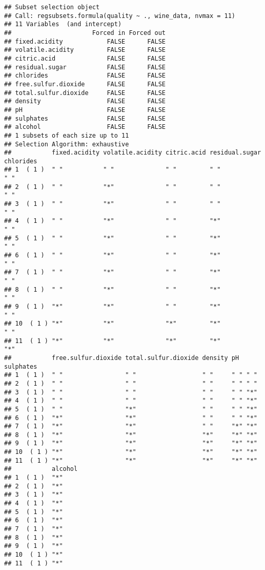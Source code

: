 \documentclass[
]{article}
\begin{document}
\begin{verbatim}
## Subset selection object
## Call: regsubsets.formula(quality ~ ., wine_data, nvmax = 11)
## 11 Variables  (and intercept)
##                      Forced in Forced out
## fixed.acidity            FALSE      FALSE
## volatile.acidity         FALSE      FALSE
## citric.acid              FALSE      FALSE
## residual.sugar           FALSE      FALSE
## chlorides                FALSE      FALSE
## free.sulfur.dioxide      FALSE      FALSE
## total.sulfur.dioxide     FALSE      FALSE
## density                  FALSE      FALSE
## pH                       FALSE      FALSE
## sulphates                FALSE      FALSE
## alcohol                  FALSE      FALSE
## 1 subsets of each size up to 11
## Selection Algorithm: exhaustive
##           fixed.acidity volatile.acidity citric.acid residual.sugar chlorides
## 1  ( 1 )  " "           " "              " "         " "            " "      
## 2  ( 1 )  " "           "*"              " "         " "            " "      
## 3  ( 1 )  " "           "*"              " "         " "            " "      
## 4  ( 1 )  " "           "*"              " "         "*"            " "      
## 5  ( 1 )  " "           "*"              " "         "*"            " "      
## 6  ( 1 )  " "           "*"              " "         "*"            " "      
## 7  ( 1 )  " "           "*"              " "         "*"            " "      
## 8  ( 1 )  " "           "*"              " "         "*"            " "      
## 9  ( 1 )  "*"           "*"              " "         "*"            " "      
## 10  ( 1 ) "*"           "*"              "*"         "*"            " "      
## 11  ( 1 ) "*"           "*"              "*"         "*"            "*"      
##           free.sulfur.dioxide total.sulfur.dioxide density pH  sulphates
## 1  ( 1 )  " "                 " "                  " "     " " " "      
## 2  ( 1 )  " "                 " "                  " "     " " " "      
## 3  ( 1 )  " "                 " "                  " "     " " "*"      
## 4  ( 1 )  " "                 " "                  " "     " " "*"      
## 5  ( 1 )  " "                 "*"                  " "     " " "*"      
## 6  ( 1 )  "*"                 "*"                  " "     " " "*"      
## 7  ( 1 )  "*"                 "*"                  " "     "*" "*"      
## 8  ( 1 )  "*"                 "*"                  "*"     "*" "*"      
## 9  ( 1 )  "*"                 "*"                  "*"     "*" "*"      
## 10  ( 1 ) "*"                 "*"                  "*"     "*" "*"      
## 11  ( 1 ) "*"                 "*"                  "*"     "*" "*"      
##           alcohol
## 1  ( 1 )  "*"    
## 2  ( 1 )  "*"    
## 3  ( 1 )  "*"    
## 4  ( 1 )  "*"    
## 5  ( 1 )  "*"    
## 6  ( 1 )  "*"    
## 7  ( 1 )  "*"    
## 8  ( 1 )  "*"    
## 9  ( 1 )  "*"    
## 10  ( 1 ) "*"    
## 11  ( 1 ) "*"
\end{verbatim}
\end{document}
